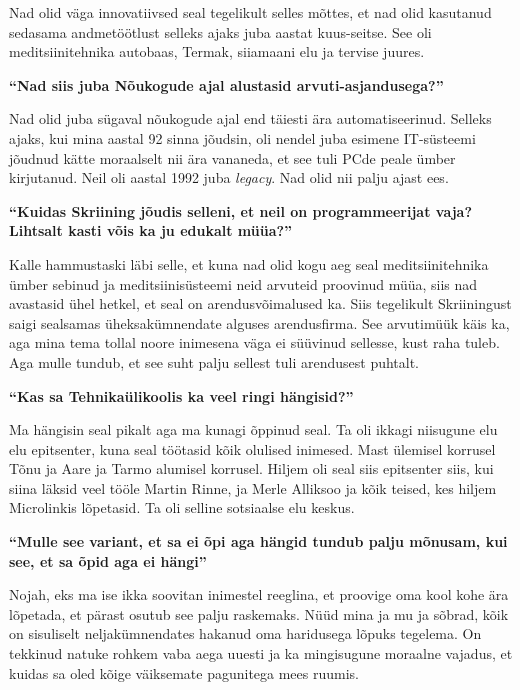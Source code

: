 Nad olid väga innovatiivsed seal tegelikult selles mõttes, et nad olid kasutanud sedasama andmetöötlust selleks ajaks juba aastat kuus-seitse. See oli  meditsiinitehnika autobaas, Termak, siiamaani elu ja tervise juures. 


\textbf{\enquote{Nad siis juba Nõukogude ajal alustasid arvuti-asjandusega?}}

Nad olid juba sügaval nõukogude ajal end täiesti ära automatiseerinud. Selleks ajaks, kui mina aastal 92 sinna jõudsin, oli nendel juba esimene IT-süsteemi jõudnud kätte moraalselt nii ära vananeda, et see tuli PCde peale ümber kirjutanud. Neil oli aastal 1992 juba \emph{legacy}. Nad olid nii palju ajast ees.


\textbf{\enquote{Kuidas Skriining jõudis selleni, et neil on programmeerijat vaja? Lihtsalt kasti võis ka ju edukalt müüa?}}

Kalle hammustaski läbi selle, et kuna nad olid kogu aeg seal meditsiinitehnika ümber sebinud ja meditsiinisüsteemi neid arvuteid proovinud müüa, siis nad avastasid ühel hetkel, et seal on arendusvõimalused ka. Siis tegelikult Skriiningust saigi sealsamas üheksakümnendate alguses  arendusfirma. See arvutimüük käis ka, aga mina tema tollal noore inimesena väga ei süüvinud sellesse, kust raha tuleb. Aga mulle tundub, et see suht palju sellest tuli arendusest puhtalt.


\textbf{\enquote{Kas sa Tehnikaülikoolis ka veel ringi hängisid?}}

Ma hängisin seal pikalt aga ma kunagi õppinud seal. Ta oli ikkagi niisugune elu elu epitsenter, kuna seal töötasid kõik olulised inimesed. Mast ülemisel korrusel Tõnu ja Aare ja Tarmo alumisel korrusel. Hiljem oli seal siis epitsenter siis, kui siina läksid veel tööle Martin Rinne, ja Merle Alliksoo ja kõik teised, kes hiljem Microlinkis lõpetasid. Ta oli selline  sotsiaalse elu keskus. 

\textbf{\enquote{Mulle see variant, et sa ei õpi aga hängid tundub palju mõnusam, kui see, et sa õpid aga ei hängi}}

Nojah, eks ma ise ikka soovitan inimestel reeglina, et  proovige oma kool kohe ära lõpetada, et pärast osutub see palju raskemaks. Nüüd mina ja mu ja sõbrad, kõik on sisuliselt neljakümnendates hakanud oma haridusega lõpuks tegelema. On tekkinud natuke rohkem vaba aega uuesti ja ka mingisugune moraalne vajadus, et kuidas sa oled kõige väiksemate pagunitega mees ruumis.

